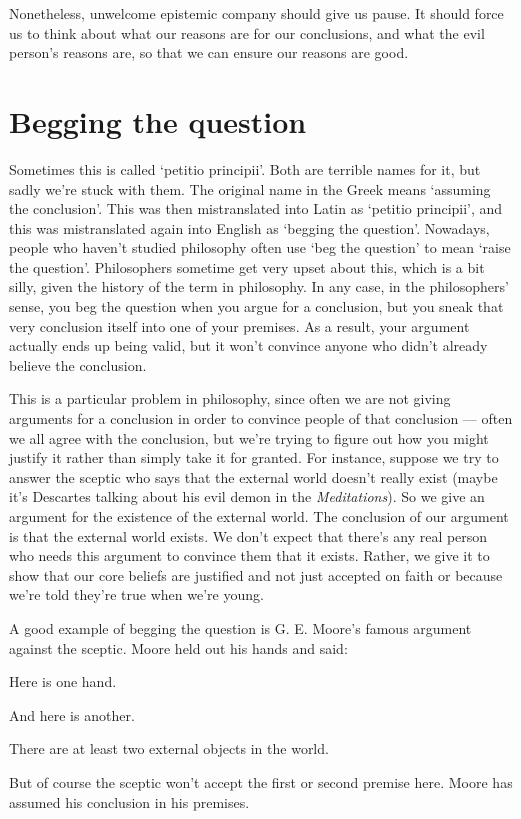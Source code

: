 Nonetheless, unwelcome epistemic company should give us pause. It should force us to think about what our reasons are for our conclusions, and what the evil person's reasons are, so that we can ensure our reasons are good.

\section{Begging the question}

Sometimes this is called `petitio principii'. Both are terrible names for it, but sadly we're stuck with them. The original name in the Greek means `assuming the conclusion'. This was then mistranslated into Latin as `petitio principii', and this was mistranslated again into English as `begging the question'. Nowadays, people who haven't studied philosophy often use `beg the question' to mean `raise the question'. Philosophers sometime get very upset about this, which is a bit silly, given the history of the term in philosophy. In any case, in the philosophers' sense, you beg the question when you argue for a conclusion, but you sneak that very conclusion itself into one of your premises. As a result, your argument actually ends up being valid, but it won't convince anyone who didn't already believe the conclusion.

This is a particular problem in philosophy, since often we are not giving arguments for a conclusion in order to convince people of that conclusion --- often we all agree with the conclusion, but we're trying to figure out how you might justify it rather than simply take it for granted. For instance, suppose we try to answer the sceptic who says that the external world doesn't really exist (maybe it's Descartes talking about his evil demon in the \emph{Meditations}). So we give an argument for the existence of the external world. The conclusion of our argument is that the external world exists. We don't expect that there's any real person who needs this argument to convince them that it exists. Rather, we give it to show that our core beliefs are justified and not just accepted on faith or because we're told they're true when we're young.

A good example of begging the question is G. E. Moore's famous argument against the sceptic. Moore held out his hands and said:
\begin{earg}
\prem Here is one hand.

\prem And here is another.

\conc There are at least two external objects in the world.
\end{earg}
But of course the sceptic won't accept the first or second premise here. Moore has assumed his conclusion in his premises.

